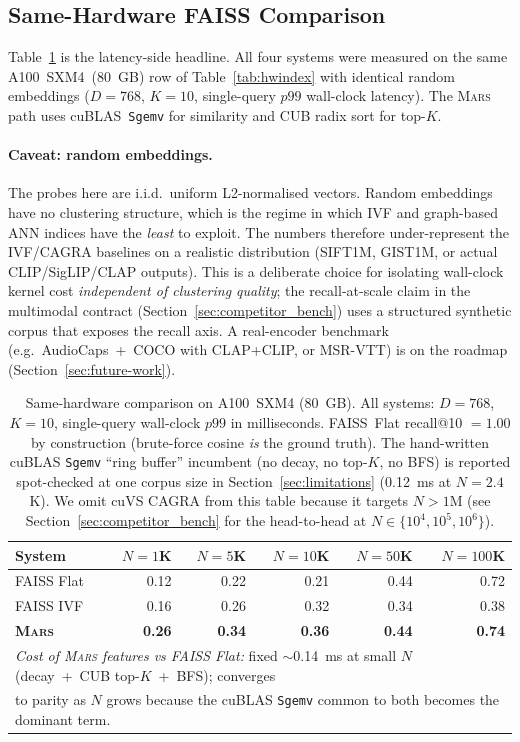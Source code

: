 \documentclass[11pt]{article}
\newcommand{\mars}{\textsc{Mars}}
\begin{document}
\subsection{Same-Hardware FAISS Comparison}
\label{sec:comparison}

Table~\ref{tab:faiss_comparison} is the latency-side headline. All
four systems were measured on the same A100~SXM4~(80~GB) row of
Table~\ref{tab:hwindex} with identical random
embeddings ($D{=}768$, $K{=}10$, single-query $p99$ wall-clock
latency). The \mars{} path uses cuBLAS~\texttt{Sgemv} for similarity
and CUB radix sort for top-$K$.

\paragraph{Caveat: random embeddings.} The probes here are i.i.d.\
uniform L2-normalised vectors. Random embeddings have no clustering
structure, which is the regime in which IVF and graph-based ANN
indices have the \emph{least} to exploit. The numbers therefore
under-represent the IVF/CAGRA baselines on a realistic distribution
(SIFT1M, GIST1M, or actual CLIP/SigLIP/CLAP outputs). This is a
deliberate choice for isolating wall-clock kernel cost
\emph{independent of clustering quality}; the recall-at-scale claim
in the multimodal contract (Section~\ref{sec:competitor_bench}) uses
a structured synthetic corpus that exposes the recall axis. A real-encoder
benchmark (e.g.\ AudioCaps~+~COCO with CLAP+CLIP, or MSR-VTT) is on
the roadmap (Section~\ref{sec:future-work}).

\begin{table}[ht]
\centering
\small
\caption{Same-hardware comparison on A100~SXM4 (80~GB). All systems:
$D{=}768$, $K{=}10$, single-query wall-clock $p99$ in milliseconds.
FAISS~Flat recall@10 $= 1.00$ by construction (brute-force cosine
\emph{is} the ground truth). The hand-written cuBLAS \texttt{Sgemv}
``ring buffer'' incumbent (no decay, no top-$K$, no BFS) is reported
spot-checked at one corpus size in Section~\ref{sec:limitations}
(0.12~ms at $N{=}2.4$K). We omit cuVS CAGRA from this table because
it targets $N{>}1$M (see Section~\ref{sec:competitor_bench} for the
head-to-head at $N \in \{10^4, 10^5, 10^6\}$).}
\label{tab:faiss_comparison}
\begin{tabular}{lrrrrr}
\toprule
\textbf{System} & \textbf{$N{=}1$K} & \textbf{$N{=}5$K} & \textbf{$N{=}10$K} & \textbf{$N{=}50$K} & \textbf{$N{=}100$K} \\
\midrule
FAISS Flat  & 0.12 & 0.22 & 0.21 & 0.44 & 0.72 \\
FAISS IVF   & 0.16 & 0.26 & 0.32 & 0.34 & 0.38 \\
\textbf{\mars{}} & \textbf{0.26} & \textbf{0.34} & \textbf{0.36} & \textbf{0.44} & \textbf{0.74} \\
\midrule
\multicolumn{6}{l}{\textit{Cost of \mars{} features vs FAISS Flat:}
fixed $\sim$0.14~ms at small $N$ (decay~+~CUB top-$K$~+~BFS); converges} \\
\multicolumn{6}{l}{to parity as $N$ grows because the cuBLAS \texttt{Sgemv}
common to both becomes the dominant term.} \\
\bottomrule
\end{tabular}
\end{table}
\end{document}
